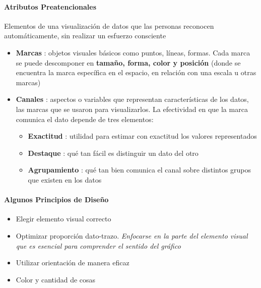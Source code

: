 \paragraph{Atributos Preatencionales}
Elementos de una visualización de datos que las personas reconocen automáticamente, sin realizar un esfuerzo consciente
\begin{itemize}
    \item {\textbf{Marcas} : objetos visuales básicos como puntos, líneas, formas. Cada marca se puede descomponer en \textbf{tamaño, forma, color y posición} (donde se encuentra la marca específica en el espacio, en relación con una escala u otras marcas)}
    \item {\textbf{Canales} : aspectos o variables que representan características de los datos, las marcas que se usaron para visualizarlos. La efectividad en que la marca comunica el dato depende de tres elementos:
    \begin{itemize}
        \item {\textbf{Exactitud} : utilidad para estimar con exactitud los valores representados}
        \item {\textbf{Destaque} : qué tan fácil es distinguir un dato del otro}
        \item {\textbf{Agrupamiento} : qué tan bien comunica el canal sobre distintos grupos que existen en los datos}
    \end{itemize}}
\end{itemize}

\paragraph{Algunos Principios de Diseño}
\begin{itemize}
    \item {Elegir elemento visual correcto}
    \item {Optimizar proporción dato-trazo. \textit{Enfocarse en la parte del elemento visual que es esencial para comprender el sentido del gráfico}}
    \item {Utilizar orientación de manera eficaz}
    \item {Color y cantidad de cosas}
\end{itemize}

